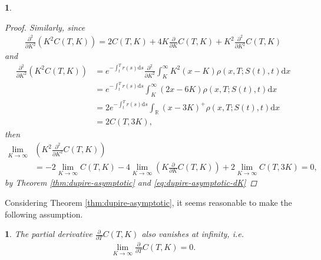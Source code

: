 \documentclass[english]{article}
\numberwithin{equation}{section}
\numberwithin{figure}{section}
\theoremstyle{bolddescit}
\theoremstyle{definition}
\theoremstyle{definition}
\theoremstyle{plain}
\newtheorem{lemma}[theorem]{\protect\lemmaname}
\theoremstyle{plain}
\theoremstyle{bolddesc}
\newtheorem{assumption}[theorem]{\protect\assumptionname}
\theoremstyle{plain}
\theoremstyle{remark}
\providecommand{\assumptionname}{Assumption}
\providecommand{\lemmaname}{Lemma}
\begin{document}
\begin{lemma}
\begin{proof}
    Similarly, since
    \begin{align*}
      \frac{\partial^2}{\partial K^2} (K^2 C(T,K))
      = 2C(T,K) + 4K \frac{\partial}{\partial K} C(T,K) + K^2 \frac{\partial^2}{\partial K^2} C(T,K)
    \end{align*}
    and
    \begin{align*}
      \frac{\partial^2}{\partial K^2} (K^2 C(T,K))
      &= e^{-\int_t^T r(s)\mathrm{d}s} \frac{\partial^2}{\partial K^2} \int_K^\infty K^2 (x-K) \rho(x,T;S(t),t) \mathrm{d}x\\
      &= e^{-\int_t^T r(s)\mathrm{d}s} \int_K^\infty (2x-6K) \rho(x,T;S(t),t) \mathrm{d}x\\
      &= 2 e^{-\int_t^T r(s)\mathrm{d}s} \int_\mathbb{R} (x-3K)^+ \rho(x,T;S(t),t) \mathrm{d}x\\
      &= 2 C(T,3K),
    \end{align*}
    then
    \begin{align*}
      \lim_{K \to \infty} &\left(K^2 \frac{\partial^2}{\partial K^2} C(T,K)\right)\\
      &= - 2\lim_{K \to \infty} C(T,K)
        - 4 \lim_{K \to \infty} \left(K \frac{\partial}{\partial K} C(T,K)\right)
        + 2 \lim_{K \to \infty} C(T,3K)
      = 0,
    \end{align*}
    by Theorem \ref{thm:dupire-asymptotic} and \eqref{eq:dupire-asymptotic-dK}
  \end{proof}
\end{lemma}

Considering Theorem \ref{thm:dupire-asymptotic}, it seems reasonable to make the following assumption.

\begin{assumption}\label{ass:dupire-asymptotic-dT}
  The partial derivative $\frac{\partial}{\partial T} C(T,K)$ also vanishes at infinity, i.e.
  \begin{align*}
    \lim_{K \to \infty} \frac{\partial}{\partial T} C(T,K) = 0.
  \end{align*}
\end{assumption}
\end{document}
